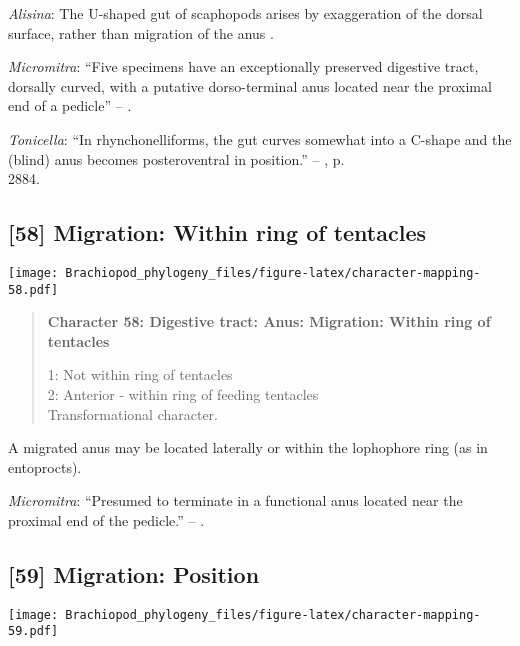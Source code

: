 \documentclass[openany]{book}
\theoremstyle{definition}
\theoremstyle{definition}
\theoremstyle{definition}
\theoremstyle{remark}
\begin{document}
\hypertarget{Alisina-coding-57}{}
\emph{Alisina}: The U-shaped gut of scaphopods arises by exaggeration of
the dorsal surface, rather than migration of the anus
\citep{Steiner1992}.

\hypertarget{Micromitra-coding-57}{}
\emph{Micromitra}: ``Five specimens have an exceptionally preserved
digestive tract, dorsally curved, with a putative dorso-terminal anus
located near the proximal end of a pedicle'' --
\citet{Zhang2007Rhynchonelliformeanbrachiopods}.

\hypertarget{Tonicella-coding-57}{}
\emph{Tonicella}: ``In rhynchonelliforms, the gut curves somewhat into a
C-shape and the (blind) anus becomes posteroventral in position.'' --
\citet{Williams2007Supplement}, p.\\
2884.

\subsection*{{[}58{]} Migration: Within ring of
tentacles}\label{migration-within-ring-of-tentacles}

\texttt{[image: Brachiopod\_phylogeny\_files/figure-latex/character-mapping-58.pdf]}

\begin{quote}
\textbf{Character 58: Digestive tract: Anus: Migration: Within ring of
tentacles}

1: Not within ring of tentacles\\
2: Anterior - within ring of feeding tentacles\\
Transformational character.
\end{quote}

A migrated anus may be located laterally or within the lophophore ring
(as in entoprocts).

\hypertarget{Micromitra-coding-58}{}
\emph{Micromitra}: ``Presumed to terminate in a functional anus located
near the proximal end of the pedicle.'' --
\citet{Zhang2007Rhynchonelliformeanbrachiopods}.

\subsection*{{[}59{]} Migration: Position}\label{migration-position}

\texttt{[image: Brachiopod\_phylogeny\_files/figure-latex/character-mapping-59.pdf]}
\end{document}
